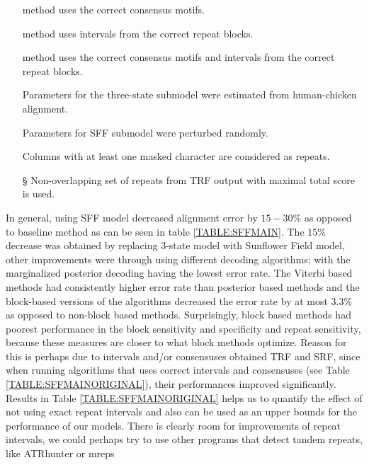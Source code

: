 \begin{itemize}[itemsep=-1mm]

\item[\M] method uses the correct consensus motifs. 

\item[\D] method uses intervals from the correct repeat blocks.

\item[\MM] method uses the correct consensus motifs and intervals from the
correct repeat blocks.

\item[\R] Parameters for the three-state submodel were estimated from
human-chicken alignment. 

\item[\RR] Parameters for SFF submodel were perturbed randomly.

\item[\DD] Columns with at least one masked character are considered as
repeats.

\item[\S] Non-overlapping set of repeats from TRF output with maximal total
score is used.

\end{itemize}



In general, using SFF model decreased alignment error by $15-30\%$ as opposed
to baseline method as can be seen in table \ref{TABLE:SFFMAIN}. The $15\%$
decrease was obtained by replacing 3-state model with Sunflower Field model,
other improvements were through using different decoding algorithms; with the
marginalized posterior decoding having the lowest error rate. The Viterbi based
methods had consistently higher error rate than posterior based methods and the
block-based versions of the algorithms decreased the error rate by at most
$3.3\%$ as opposed to non-block based methods.  Surprisingly, block based
methods had poorest performance in the block sensitivity and specificity and
repeat sensitivity, because these measures are closer to what block methods
optimize. Reason for this is perhaps due to {intervals and/or consensuses
obtained TRF and SRF}, since when running algorithms that uses correct
intervals and consensuses (see Table \ref{TABLE:SFFMAINORIGINAL}), their
performances improved significantly.  Results in Table
\ref{TABLE:SFFMAINORIGINAL} helps us to quantify the effect of not using exact
repeat intervals and also can be used as an upper bounds for the performance of
our models. There is clearly room for improvements of repeat intervals, we
could perhaps try to use other programs that detect tandem repeats, like
ATRhunter \cite{Wexler2005} or mreps \cite{Kolpakov2003}

